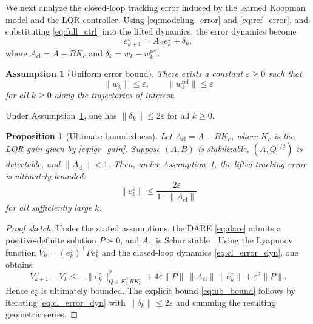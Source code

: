 \documentclass[journal]{IEEEtran}
\newtheorem{assumption}{Assumption}
\newtheorem{proposition}{Proposition}
\begin{document}
We next analyze the closed-loop tracking error induced by the learned Koopman model and the LQR controller. Using \eqref{eq:modeling_error} and \eqref{eq:ref_error}, and substituting \eqref{eq:full_ctrl} into the lifted dynamics, the error dynamics become
\begin{equation}
    e_{k+1}^z = A_{\mathrm{cl}} e_k^z + \delta_k,
    \label{eq:cl_error_dyn}
\end{equation}
where $A_{\mathrm{cl}} = A - BK_c$ and $\delta_k = w_k - w_k^{\mathrm{ref}}$.

\begin{assumption}[Uniform error bound]
\label{assump:bound}
There exists a constant $\varepsilon \geq 0$ such that
\begin{equation}
    \|w_k\| \leq \varepsilon,
    \qquad
    \|w_k^{\mathrm{ref}}\| \leq \varepsilon
    \label{eq:error_bound}
\end{equation}
for all $k \geq 0$ along the trajectories of interest.
\end{assumption}

Under Assumption~\ref{assump:bound}, one has $\|\delta_k\| \leq 2\varepsilon$ for all $k \geq 0$.

\begin{proposition}[Ultimate boundedness]
\label{prop:ub}
Let $A_{\mathrm{cl}} = A - BK_c$, where $K_c$ is the LQR gain given by \eqref{eq:lqr_gain}. Suppose $(A,B)$ is stabilizable, $(A,Q^{1/2})$ is detectable, and $\|A_{\mathrm{cl}}\| < 1$. Then, under Assumption~\ref{assump:bound}, the lifted tracking error is ultimately bounded:
\begin{equation}
    \|e_k^z\| \leq \frac{2\varepsilon}{1 - \|A_{\mathrm{cl}}\|}
    \label{eq:ub_bound}
\end{equation}
for all sufficiently large $k$.
\end{proposition}

\begin{proof}[Proof sketch]
Under the stated assumptions, the DARE \eqref{eq:dare} admits a positive-definite solution $P \succ 0$, and $A_{\mathrm{cl}}$ is Schur stable \cite{korda2018linear}. Using the Lyapunov function $V_k = (e_k^z)^\top P e_k^z$ and the closed-loop dynamics \eqref{eq:cl_error_dyn}, one obtains
\begin{equation}
    V_{k+1} - V_k
    \leq
    -\|e_k^z\|_{Q+K_c^\top R K_c}^2
    + 4\varepsilon \|P\|\,\|A_{\mathrm{cl}}\|\,\|e_k^z\|
    + \varepsilon^2 \|P\|.
\end{equation}
Hence $e_k^z$ is ultimately bounded. The explicit bound \eqref{eq:ub_bound} follows by iterating \eqref{eq:cl_error_dyn} with $\|\delta_k\| \leq 2\varepsilon$ and summing the resulting geometric series.
\end{proof}
\end{document}
